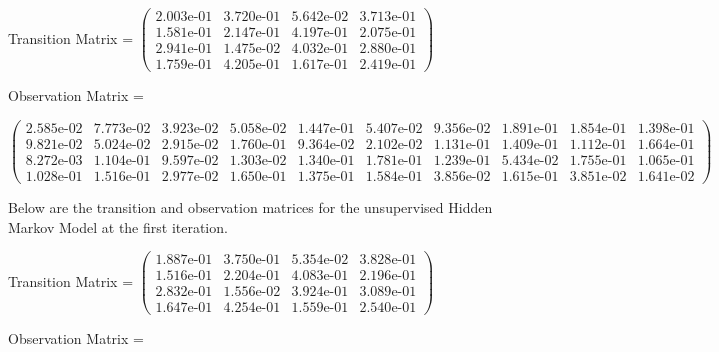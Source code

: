Transition Matrix = \small $\begin{pmatrix}
2.003\text{e-}01 & 3.720\text{e-}01 & 5.642\text{e-}02 & 3.713\text{e-}01\\
1.581\text{e-}01 & 2.147\text{e-}01 & 4.197\text{e-}01 & 2.075\text{e-}01\\
2.941\text{e-}01 & 1.475\text{e-}02 & 4.032\text{e-}01 & 2.880\text{e-}01\\
1.759\text{e-}01 & 4.205\text{e-}01 & 1.617\text{e-}01 & 2.419\text{e-}01 
\end{pmatrix}$
\normalsize

Observation Matrix =

\small
$\begin{pmatrix}
2.585\text{e-}02 & 7.773\text{e-}02 & 3.923\text{e-}02 & 5.058\text{e-}02 & 1.447\text{e-}01 & 5.407\text{e-}02 & 9.356\text{e-}02 & 1.891\text{e-}01 & 1.854\text{e-}01 & 1.398\text{e-}01\\
9.821\text{e-}02 & 5.024\text{e-}02 & 2.915\text{e-}02 & 1.760\text{e-}01 & 9.364\text{e-}02 & 2.102\text{e-}02 & 1.131\text{e-}01 & 1.409\text{e-}01 & 1.112\text{e-}01 & 1.664\text{e-}01\\
8.272\text{e-}03 & 1.104\text{e-}01 & 9.597\text{e-}02 & 1.303\text{e-}02 & 1.340\text{e-}01 & 1.781\text{e-}01 & 1.239\text{e-}01 & 5.434\text{e-}02 & 1.755\text{e-}01 & 1.065\text{e-}01\\
1.028\text{e-}01 & 1.516\text{e-}01 & 2.977\text{e-}02 & 1.650\text{e-}01 & 1.375\text{e-}01 & 1.584\text{e-}01 & 3.856\text{e-}02 & 1.615\text{e-}01 & 3.851\text{e-}02 & 1.641\text{e-}02 
\end{pmatrix}$
\normalsize
\medskip

Below are the transition and observation matrices for the unsupervised Hidden Markov Model at the first iteration.

Transition Matrix = \small $\begin{pmatrix}
1.887\text{e-}01 & 3.750\text{e-}01 & 5.354\text{e-}02 & 3.828\text{e-}01\\
1.516\text{e-}01 & 2.204\text{e-}01 & 4.083\text{e-}01 & 2.196\text{e-}01\\
2.832\text{e-}01 & 1.556\text{e-}02 & 3.924\text{e-}01 & 3.089\text{e-}01\\
1.647\text{e-}01 & 4.254\text{e-}01 & 1.559\text{e-}01 & 2.540\text{e-}01   
\end{pmatrix}$
\normalsize

Observation Matrix =

